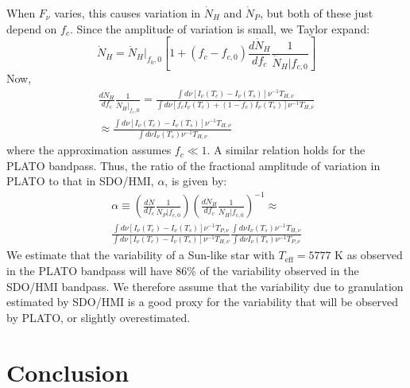 When $F_\nu$ varies, this causes variation in $\dot{N}_H$ and $\dot{N}_P$, but both of these just depend on $f_c$. Since the amplitude of variation is small, we Taylor expand:
\begin{equation}
\dot { N } _ { H } = \dot { N } _ { H } | _ { f _ { 0} ,0} \left[ 1+ \left( f _ { c } - f _ { c ,0} \right) \frac { d \dot { N } _ { H } } { d f _ { c } } \frac { 1} { \dot { N } _ { H } | f _ { c ,0} } \right]
\end{equation}
Now,
\begin{multline}
\frac { d \dot { N } _ { H } } { d f _ { c } } \frac { 1} { \dot { N } _ { H } | _ { f _ { c } ,0} } = \frac { \int d \nu \left[ I _ { \nu } \left( T _ { c } \right) - I _ { \nu } \left( T _ { s } \right) \right] \nu ^ { - 1} T _ { H ,\nu } } { \int d \nu \left[ f _ { c } I _ { \nu } \left( T _ { c } \right) + \left( 1- f _ { c } \right) I _ { \nu } \left( T _ { s } \right) \right] \nu ^ { - 1} T _ { H ,\nu } } \\
\approx \frac { \int d \nu  \left[ I _ { \nu } \left( T _ { c } \right) - I _ { \nu } \left( T _ { s } \right) \right]  \nu ^ { - 1} T _ { H ,\nu } } { \int d \nu I _ { \nu } \left( T _ { s } \right) \nu ^ { - 1} T_{H ,\nu} }
\end{multline}
where the approximation assumes $f_c \ll 1$. A similar relation holds for the PLATO bandpass. Thus, the ratio of the fractional amplitude of
variation in PLATO to that in SDO/HMI, $\alpha$, is given by:
\begin{multline}
\alpha \equiv \left( \frac { d \dot{N} } { d f _ { c } } \frac { 1} { \dot { N }_P | f _ { c ,0} } 
\right)  \left( \frac { d \dot{N} _ { H } } { d f _ { c } } \frac {1} { \dot{N} _ { H } | f _ { c ,0} } \right)^{-1} \approx\\
\frac { \int d \nu [I_\nu(T_c)-I_\nu(T_s)] \nu ^ { - 1} T _ { P ,\nu } } { \int d \nu [I_\nu(T_c)-I_\nu(T_s)] \nu ^ { - 1} T _ { H ,\nu } } \frac { \int d \nu I _ { \nu } \left( T _ { s } \right) \nu ^ { - 1} T _ { H ,\nu } } { \int d \nu I _ { \nu } \left( T _ { s } \right) \nu ^ { - 1} T_{P ,\nu}}
\end{multline}
We estimate that the variability of a Sun-like star with $T_\mathrm{eff} = 5777$ K as observed in the PLATO bandpass will have 86\% of the variability observed in the SDO/HMI bandpass. We therefore assume that the variability due to granulation estimated by SDO/HMI is a good proxy for the variability that will be observed by PLATO, or slightly overestimated.

\section{Conclusion} \label{sec:conclusion}

